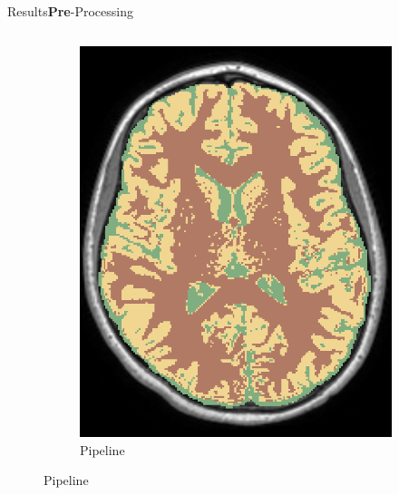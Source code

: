\documentclass[]{standalone}
\begin{document}
\begin{frame}{Results}{\textbf{Pre}-Processing}
\begin{columns}
\begin{column}{0.65\textwidth}
\begin{figure}[h!]
\begin{subfigure}{0.3\textwidth}
					\includegraphics[scale=0.11]{./IMG/SEG48.png}
					\caption*{\tiny Pipeline}
				\end{subfigure}
			\end{figure}
		\end{column}
	\end{columns}
	
	\end{frame}
\end{document}
